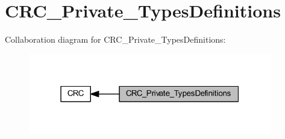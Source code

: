 \hypertarget{group___c_r_c___private___types_definitions}{}\section{C\+R\+C\+\_\+\+Private\+\_\+\+Types\+Definitions}
\label{group___c_r_c___private___types_definitions}
Collaboration diagram for C\+R\+C\+\_\+\+Private\+\_\+\+Types\+Definitions\+:
\nopagebreak
\begin{figure}[H]
\begin{center}
\leavevmode
\includegraphics[width=301pt]{group___c_r_c___private___types_definitions}
\end{center}
\end{figure}
